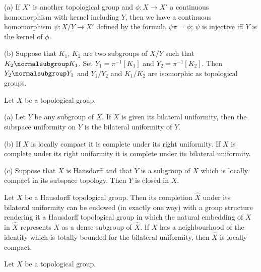 (a) If $X'$ is another topological group and $\phi:X\to X'$ a continuous
homomorphism with kernel including $Y$, then we have a continuous
homomorphism $\psi:X/Y\to X'$ defined by the formula $\psi\pi=\phi$;
$\psi$ is injective iff $Y$ is the kernel of $\phi$.

(b) Suppose that $K_1$, $K_2$ are two subgroups of $X/Y$ such that
$K_2\normalsubgroup K_1$.   Set
$Y_1=\pi^{-1}[K_1]$ and $Y_2=\pi^{-1}[K_2]$.   Then
$Y_2\normalsubgroup Y_1$ and
$Y_1/Y_2$ and $K_1/K_2$ are isomorphic as topological groups.


 Let $X$ be a topological group.

(a) Let $Y$ be any subgroup of $X$.   If $X$ is given its bilateral
uniformity, then the subspace uniformity on $Y$ is the bilateral
uniformity of $Y$.  

(b) If $X$ is locally compact it is complete under its right uniformity.
   If $X$ is complete under its right
uniformity it is complete under its bilateral uniformity.

(c) Suppose that $X$ is Hausdorff and that $Y$ is a subgroup of $X$
which is locally compact in its subspace topology.   Then $Y$ is closed
in $X$.  

 Let $X$ be a Hausdorff topological group.   Then
its completion $\widehat{X}$ under its bilateral uniformity can be
endowed (in exactly one way) with a group structure rendering it a
Hausdorff topological group in which the natural embedding of $X$ in
$\widehat{X}$ represents $X$ as a dense subgroup of $\widehat{X}$.
If $X$ has a neighbourhood of the identity which is totally bounded for
the bilateral uniformity, then $\widehat{X}$ is locally compact.

 Let $X$ be a topological group.

